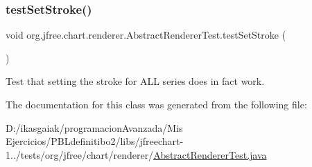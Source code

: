 \subsubsection{\texorpdfstring{test\+Set\+Stroke()}{testSetStroke()}}
{\footnotesize\ttfamily void org.\+jfree.\+chart.\+renderer.\+Abstract\+Renderer\+Test.\+test\+Set\+Stroke (\begin{DoxyParamCaption}{ }\end{DoxyParamCaption})}

Test that setting the stroke for A\+LL series does in fact work. 

The documentation for this class was generated from the following file\+:\begin{DoxyCompactItemize}
\item 
D\+:/ikasgaiak/programacion\+Avanzada/\+Mis Ejercicios/\+P\+B\+Ldefinitibo2/libs/jfreechart-\/1../tests/org/jfree/chart/renderer/\mbox{\hyperlink{_abstract_renderer_test_8java}{Abstract\+Renderer\+Test.\+java}}\end{DoxyCompactItemize}
